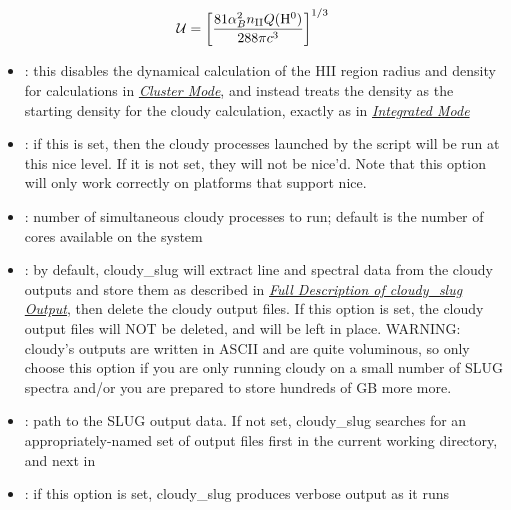 \documentclass[letterpaper,10pt,english]{sphinxmanual}
\begin{document}
\begin{gather}
\begin{split}\mathcal{U} = \left[\frac{81 \alpha_B^2 n_{\mathrm{II}}
Q(\mathrm{H}^0)}{288 \pi c^3}\right]^{1/3}\end{split}\notag
\end{gather}\begin{itemize}
\item {} 
: this disables the dynamical calculation of the
HII region radius and density for calculations in
{\hyperref[cloudy:sssec-cloudy-cluster-mode]{\emph{Cluster Mode}}}, and instead treats the density as
the starting density for the cloudy calculation, exactly as in
{\hyperref[cloudy:sssec-cloudy-integrated-mode]{\emph{Integrated Mode}}}

\item {} 
: if this is set, then the
cloudy processes launched by the script will be run at this nice
level. If it is not set, they will not be nice'd. Note that this
option will only work correctly on platforms that support nice.

\item {} 
: number of simultaneous cloudy processes
to run; default is the number of cores available on the system

\item {} 
: by default, cloudy\_slug will extract line and
spectral data from the cloudy outputs and store them as described in
{\hyperref[cloudy:ssec-cloudy-output]{\emph{Full Description of cloudy\_slug Output}}}, then delete the cloudy output files. If
this option is set, the cloudy output files will NOT be deleted, and
will be left in place. WARNING: cloudy's outputs are written in
ASCII and are quite voluminous, so only choose this option if you
are only running cloudy on a small number of SLUG spectra and/or you
are prepared to store hundreds of GB more more.

\item {} 
: path to the SLUG output data. If not set,
cloudy\_slug searches for an appropriately-named set of output files
first in the current working directory, and next in

\item {} 
: if this option is set, cloudy\_slug produces
verbose output as it runs

\end{itemize}
\end{document}
